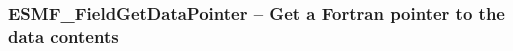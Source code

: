  
\setlength{\parskip}{0pt}
\setlength{\parindent}{0pt}
\setlength{\baselineskip}{11pt}
 
\def\bv{\begin{verbatim}}
\def\ev{\end{verbatim}}
\def\be{\begin{equation}}
\def\ee{\end{equation}}
\def\bea{\begin{eqnarray}}
\def\eea{\end{eqnarray}}
\def\bi{\begin{itemize}}
\def\ei{\end{itemize}}
\def\bn{\begin{enumerate}}
\def\en{\end{enumerate}}
\def\bd{\begin{description}}
\def\ed{\end{description}}
\def\({\left (}
\def\){\right )}
\def\[{\left [}
\def\]{\right ]}
\def\<{\left  \langle}
\def\>{\right \rangle}
\def\cI{{\cal I}}
\def\diag{\mathop{\rm diag}}
\def\tr{\mathop{\rm tr}}


 
\subsubsection [ESMF\_FieldGetDataPointer] {ESMF\_FieldGetDataPointer -- Get a Fortran pointer to the data contents}



